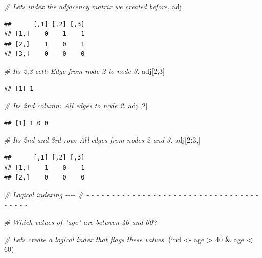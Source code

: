 \documentclass[
]{book}
\newenvironment{Shaded}{\begin{snugshade}}{\end{snugshade}}
\newcommand{\CommentTok}[1]{\textcolor[rgb]{0.56,0.35,0.01}{\textit{#1}}}
\newcommand{\DecValTok}[1]{\textcolor[rgb]{0.00,0.00,0.81}{#1}}
\newcommand{\NormalTok}[1]{#1}
\newcommand{\OtherTok}[1]{\textcolor[rgb]{0.56,0.35,0.01}{#1}}
\newcommand{\SpecialCharTok}[1]{\textcolor[rgb]{0.81,0.36,0.00}{\textbf{#1}}}
\begin{document}
\begin{Shaded}
\begin{Highlighting}[]
\CommentTok{\# Let\textquotesingle{}s index the adjacency matrix we created before.}
\NormalTok{adj}
\end{Highlighting}
\end{Shaded}

\begin{verbatim}
##      [,1] [,2] [,3]
## [1,]    0    1    1
## [2,]    1    0    1
## [3,]    0    0    0
\end{verbatim}

\begin{Shaded}
\begin{Highlighting}[]
\CommentTok{\# Its 2,3 cell: Edge from node 2 to node 3.}
\NormalTok{adj[}\DecValTok{2}\NormalTok{,}\DecValTok{3}\NormalTok{]}
\end{Highlighting}
\end{Shaded}

\begin{verbatim}
## [1] 1
\end{verbatim}

\begin{Shaded}
\begin{Highlighting}[]
\CommentTok{\# Its 2nd column: All edges to node 2.}
\NormalTok{adj[,}\DecValTok{2}\NormalTok{]}
\end{Highlighting}
\end{Shaded}

\begin{verbatim}
## [1] 1 0 0
\end{verbatim}

\begin{Shaded}
\begin{Highlighting}[]
\CommentTok{\# Its 2nd and 3rd row: All edges from nodes 2 and 3.}
\NormalTok{adj[}\DecValTok{2}\SpecialCharTok{:}\DecValTok{3}\NormalTok{,]}
\end{Highlighting}
\end{Shaded}

\begin{verbatim}
##      [,1] [,2] [,3]
## [1,]    1    0    1
## [2,]    0    0    0
\end{verbatim}

\begin{Shaded}
\begin{Highlighting}[]
\CommentTok{\# Logical indexing                                                          {-}{-}{-}{-}}
\CommentTok{\# {-} {-} {-} {-} {-} {-} {-} {-} {-} {-} {-} {-} {-} {-} {-} {-} {-} {-} {-} {-} {-} {-} {-} {-} {-} {-} {-} {-} {-} {-} {-} {-} {-} {-} {-} {-} {-} {-} {-} }

\CommentTok{\# Which values of "age" are between 40 and 60?}

\CommentTok{\# Let\textquotesingle{}s create a logical index that flags these values.}
\NormalTok{(ind }\OtherTok{\textless{}{-}}\NormalTok{ age }\SpecialCharTok{\textgreater{}} \DecValTok{40} \SpecialCharTok{\&}\NormalTok{ age }\SpecialCharTok{\textless{}} \DecValTok{60}\NormalTok{)}
\end{Highlighting}
\end{Shaded}
\end{document}
